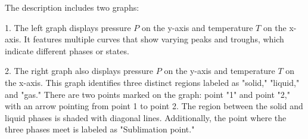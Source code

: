 The description includes two graphs:

1. The left graph displays pressure \( P \) on the y-axis and temperature \( T \) on the x-axis. It features multiple curves that show varying peaks and troughs, which indicate different phases or states.

2. The right graph also displays pressure \( P \) on the y-axis and temperature \( T \) on the x-axis. This graph identifies three distinct regions labeled as "solid," "liquid," and "gas." There are two points marked on the graph: point "1" and point "2," with an arrow pointing from point 1 to point 2. The region between the solid and liquid phases is shaded with diagonal lines. Additionally, the point where the three phases meet is labeled as "Sublimation point."